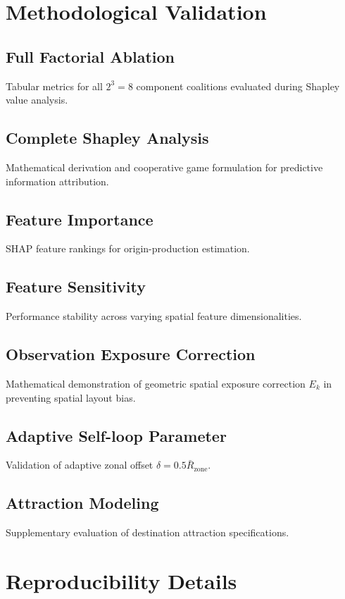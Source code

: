 \documentclass[pdflatex,sn-basic,iicol]{sn-jnl}
\begin{document}
\begin{appendices}
\section{Methodological Validation}\label{app:validation}
\subsection{Full Factorial Ablation}
Tabular metrics for all $2^3 = 8$ component coalitions evaluated during Shapley value analysis.

\subsection{Complete Shapley Analysis}
Mathematical derivation and cooperative game formulation for predictive information attribution.

\subsection{Feature Importance}
SHAP feature rankings for origin-production estimation.

\subsection{Feature Sensitivity}
Performance stability across varying spatial feature dimensionalities.

\subsection{Observation Exposure Correction}
Mathematical demonstration of geometric spatial exposure correction $E_k$ in preventing spatial layout bias.

\subsection{Adaptive Self-loop Parameter}
Validation of adaptive zonal offset $\delta = 0.5 \bar{R}_{\mathrm{zone}}$.

\subsection{Attraction Modeling}
Supplementary evaluation of destination attraction specifications.

\section{Reproducibility Details}\label{app:reproducibility}

\end{appendices}
\end{document}
